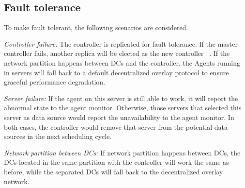 


\subsection{Fault tolerance}
\label{subsec:system:fault}
To make \name fault tolerant, the following scenarios are considered.%

\begin{packedenumerate}
\item \emph{Controller failure:} The controller is replicated for fault tolerance. If the master controller fails, another replica will be elected as the new controller ~\cite{lamport1998part}. If the network partition happens between DCs and the controller, the Agents running in servers will fall back to a default decentralized overlay protocol to ensure graceful performance degradation.
\item \emph{Server failure:} If the agent on this server is still able to work, it will report the abnormal state to the agent monitor. Otherwise, those servers that selected this server as data source would report the unavailability to the agent monitor. In both cases, the controller would remove that server from the potential data sources in the next scheduling cycle.
\item \emph{Network partition between DCs:}
If network partition happens between DCs, the DCs located in the same partition with the controller will work the same as before, while the separated DCs will fall back to the decentralized overlay network.
\end{packedenumerate}
%
%
%
%
%



